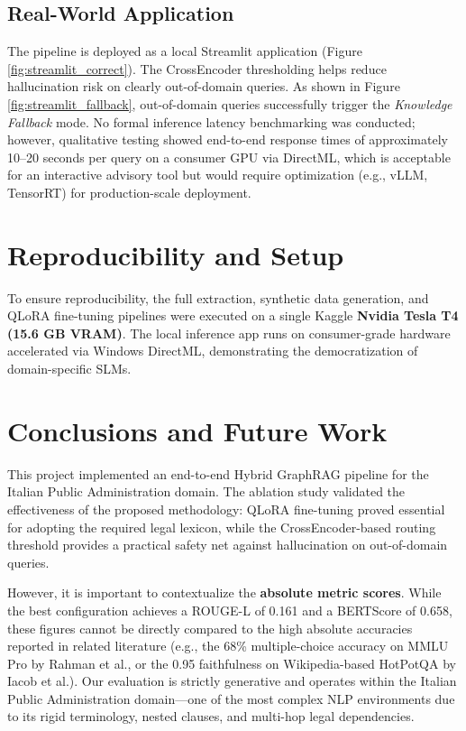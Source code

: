 \documentclass[11pt,a4paper]{article}
\begin{document}
\subsection{Real-World Application}
The pipeline is deployed as a local Streamlit application (Figure \ref{fig:streamlit_correct}). The CrossEncoder thresholding helps reduce hallucination risk on clearly out-of-domain queries. As shown in Figure \ref{fig:streamlit_fallback}, out-of-domain queries successfully trigger the \textit{Knowledge Fallback} mode. No formal inference latency benchmarking was conducted; however, qualitative testing showed end-to-end response times of approximately 10--20 seconds per query on a consumer GPU via DirectML, which is acceptable for an interactive advisory tool but would require optimization (e.g., vLLM, TensorRT) for production-scale deployment.

\section{Reproducibility and Setup}
To ensure reproducibility, the full extraction, synthetic data generation, and QLoRA fine-tuning pipelines were executed on a single Kaggle \textbf{Nvidia Tesla T4 (15.6 GB VRAM)}. The local inference app runs on consumer-grade hardware accelerated via Windows DirectML, demonstrating the democratization of domain-specific SLMs. 

\section{Conclusions and Future Work}
This project implemented an end-to-end Hybrid GraphRAG pipeline for the Italian Public Administration domain. The ablation study validated the effectiveness of the proposed methodology: QLoRA fine-tuning proved essential for adopting the required legal lexicon, while the CrossEncoder-based routing threshold provides a practical safety net against hallucination on out-of-domain queries.

However, it is important to contextualize the \textbf{absolute metric scores}. While the best configuration achieves a ROUGE-L of 0.161 and a BERTScore of 0.658, these figures cannot be directly compared to the high absolute accuracies reported in related literature (e.g., the 68\% multiple-choice accuracy on MMLU Pro by Rahman et al., or the 0.95 faithfulness on Wikipedia-based HotPotQA by Iacob et al.). Our evaluation is strictly generative and operates within the Italian Public Administration domain---one of the most complex NLP environments due to its rigid terminology, nested clauses, and multi-hop legal dependencies. 
\end{document}
